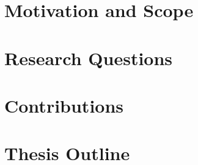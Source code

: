 \placeholder{}

\ifpdf
    \graphicspath{{Chapter1/Figs/Raster/}{Chapter1/Figs/PDF/}{Chapter1/Figs/}}
\else
    \graphicspath{{Chapter1/Figs/Vector/}{Chapter1/Figs/}}
\fi


\section{Motivation and Scope} %




\section{Research Questions}\label{sec:ResearchQuestions} %


\section{Contributions}


\section{Thesis Outline} 

